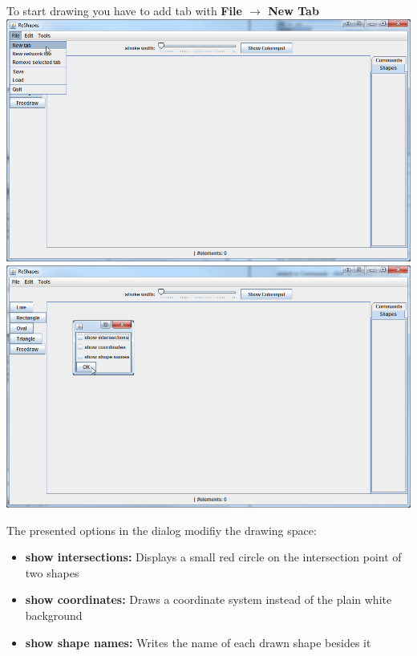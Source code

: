 \documentclass[12pt, accentcolor=tud9c, linedtoc, bigchapter, colorback, noresetcounter, numbersubsubsec]{tudreport}
\begin{document}
To start drawing you have to add tab with \textbf{File $\rightarrow$ New Tab} \\
\includegraphics[width=1\textwidth]{img/add_new_tab_1} \\
\includegraphics[width=1\textwidth]{img/add_new_tab_2} 

The presented options in the dialog modifiy the drawing space:
\begin{itemize}
    \item \textbf{show intersections:} 
        Displays a small red circle on the intersection point of two shapes
    \item \textbf{show coordinates:}
        Draws a coordinate system instead of the plain white background
    \item \textbf{show shape names:}
        Writes the name of each drawn shape besides it
\end{itemize}
\end{document}
